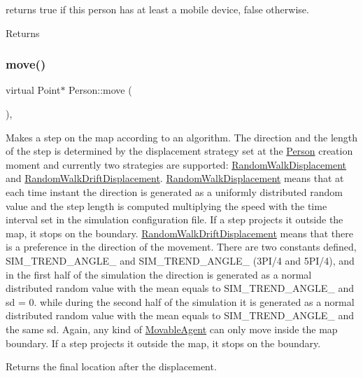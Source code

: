 returns true if this person has at least a mobile device, false otherwise. \begin{DoxyReturn}{Returns}

\end{DoxyReturn}
\mbox{\label{class_person_a922e0462a1e7eac6523a9a864ce27afc}} 
\subsubsection{\texorpdfstring{move()}{move()}}
{\footnotesize\ttfamily virtual Point$\ast$ Person\+::move (\begin{DoxyParamCaption}{ }\end{DoxyParamCaption})\hspace{0.3cm}{\ttfamily [override]}, {\ttfamily [virtual]}}

Makes a step on the map according to an algorithm. The direction and the length of the step is determined by the displacement strategy set at the \mbox{\hyperlink{class_person}{Person}} creation moment and currently two strategies are supported\+: \mbox{\hyperlink{class_random_walk_displacement}{Random\+Walk\+Displacement}} and \mbox{\hyperlink{class_random_walk_drift_displacement}{Random\+Walk\+Drift\+Displacement}}. \mbox{\hyperlink{class_random_walk_displacement}{Random\+Walk\+Displacement}} means that at each time instant the direction is generated as a uniformly distributed random value and the step length is computed multiplying the speed with the time interval set in the simulation configuration file. If a step projects it outside the map, it stops on the boundary. \mbox{\hyperlink{class_random_walk_drift_displacement}{Random\+Walk\+Drift\+Displacement}} means that there is a preference in the direction of the movement. There are two constants defined, S\+I\+M\+\_\+\+T\+R\+E\+N\+D\+\_\+\+A\+N\+G\+L\+E\+\_ and S\+I\+M\+\_\+\+T\+R\+E\+N\+D\+\_\+\+A\+N\+G\+L\+E\+\_ (3P\+I/4 and 5P\+I/4), and in the first half of the simulation the direction is generated as a normal distributed random value with the mean equals to S\+I\+M\+\_\+\+T\+R\+E\+N\+D\+\_\+\+A\+N\+G\+L\+E\+\_ and sd = 0. while during the second half of the simulation it is generated as a normal distributed random value with the mean equals to S\+I\+M\+\_\+\+T\+R\+E\+N\+D\+\_\+\+A\+N\+G\+L\+E\+\_ and the same sd. Again, any kind of \mbox{\hyperlink{class_movable_agent}{Movable\+Agent}} can only move inside the map boundary. If a step projects it outside the map, it stops on the boundary. \begin{DoxyReturn}{Returns}
the final location after the displacement. 
\end{DoxyReturn}


